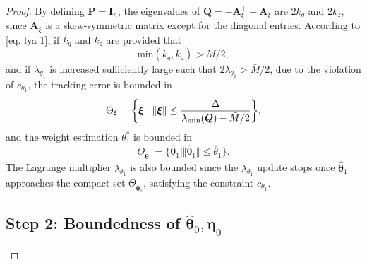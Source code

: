 \documentclass[letterpaper, 10 pt, conference]{ieeeconf}  %
\newcommand*{\mv}[1]{\boldsymbol{#1}}
\newcommand*{\mm}[1]{\boldsymbol{#1}}
\begin{document}
\begin{proof}
By defining $\mm P=\mm I_n$, the eigenvalues of $\mm Q=-\mm A_\xi^\top -\mm A_\xi$ are $2k_q$ and $2k_z$, since $\mm A_\xi$ is a skew-symmetric matrix except for the diagonal entries.
According to \eqref{eq. lya 1}, if $k_q$ and $k_z$ are provided that
\begin{equation}
    \text{min}(k_q,k_z)>\bar M/2
    ,
    \label{eq. ctrl stable condition}
\end{equation}
and if $\lambda_{\theta_1}$ is increased sufficiently large such that $2\lambda_{\theta_1}>\bar M/2$, due to the violation of $c_{\theta_1}$, the tracking error is bounded in
\begin{equation}
    \Theta_\xi = 
    \bigg\{
        \mv\xi\mid\Vert\mv\xi\Vert \le  
        {
            \bar \Delta \over \lambda _\text{min}(\mm Q)-\bar M/2
        } 
    \bigg\}
    ,
\end{equation}
and the weight estimation $\theta^*_1$ is bounded in
\begin{equation}
    \Theta_{{\hat{\mv\theta}}_1} = 
    \{ 
        {\hat{\mv\theta}_1} 
        \mid
        \Vert{\hat{\mv\theta}_1}\Vert 
        \le  
        \bar\theta_1
    \}
    .
\end{equation}
The Lagrange multiplier $\lambda_{\theta_1}$ is also bounded since the $\lambda_{\theta_1}$ update stops once ${\hat{\mv\theta}}_1$ approaches the compact set $\Theta_{{\hat{\mv\theta}}_1}$, satisfying the constraint $c_{\theta_1}$.

\subsection*{Step 2: Boundedness of ${\hat{\mv\theta}}_0,{\mm \eta}_0$}


\end{proof}
\end{document}
